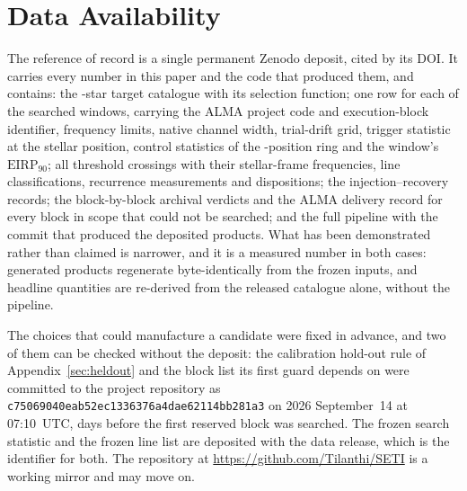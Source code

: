 \section*{Data Availability}
\label{sec:data}
The reference of record is a single permanent Zenodo deposit, cited by its
DOI. It carries every number in this paper and the code that produced them,
and contains: the \NStars-star target catalogue with its selection
function; one row for each of the \NWindows{} searched windows, carrying
the ALMA project code and execution-block identifier, frequency limits,
native channel width, trial-drift grid, trigger statistic at the stellar
position, control statistics of the \NCtrl-position ring and the window's
$\mathrm{EIRP}_{90}$; all \NCross{} threshold crossings with their
stellar-frame frequencies, line classifications, recurrence measurements
and dispositions; the injection--recovery records; the block-by-block
archival verdicts and the ALMA delivery record for every block in scope
that could not be searched; and the full pipeline with the commit that
produced the deposited products. What has been demonstrated
rather than claimed is narrower, and it is a measured number in both cases:
\NRegenProducts{} generated products regenerate byte-identically from the
frozen inputs, and \NReproChecks{} headline quantities are re-derived from
the released catalogue alone, without the pipeline.

The choices that could manufacture a candidate were fixed in advance, and
two of them can be checked without the deposit: the calibration hold-out
rule of Appendix~\ref{sec:heldout} and the block list its first guard
depends on were committed to the project repository as
\texttt{c75069040eab52ec1336376a4dae62114bb281a3} on 2026 September~14 at
07:10~UTC, \HoLeadBlockDays{} days before the first reserved block was
searched. The frozen search statistic and the frozen line list are
deposited with the data release, which is the identifier for both. The
repository at \url{https://github.com/Tilanthi/SETI} is a working mirror
and may move on.

